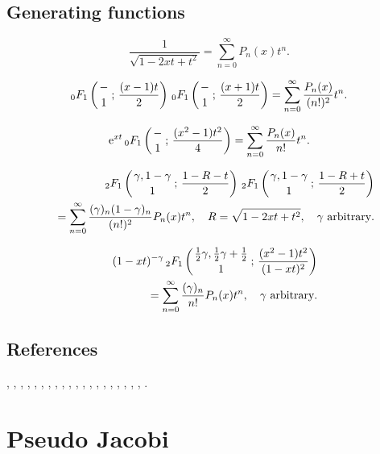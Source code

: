 \documentclass[envcountchap,graybox]{svmono}
\newcommand{\hyp}[5]{\mbox{}_{#1}{F}_{#2}
\left(\genfrac{}{}{0pt}{}{#3}{#4}\,;\,#5\right)}
\newcommand{\e}{\textrm{e}}
\begin{document}
\subsection*{Generating functions}
\begin{equation}
\label{GenLegendre1}
\frac{1}{\sqrt{1-2xt+t^2}}=\sum_{n=0}^{\infty}P_n(x)t^n.
\end{equation}

\begin{equation}
\label{GenLegendre2}
\hyp{0}{1}{-}{1}{\frac{(x-1)t}{2}}\,\hyp{0}{1}{-}{1}{\frac{(x+1)t}{2}}=
\sum_{n=0}^{\infty}\frac{P_n(x)}{(n!)^2}t^n.
\end{equation}

\begin{equation}
\label{GenLegendre3}
\e^{xt}\,\hyp{0}{1}{-}{1}{\frac{(x^2-1)t^2}{4}}=
\sum_{n=0}^{\infty}\frac{P_n(x)}{n!}t^n.
\end{equation}

\begin{eqnarray}
\label{GenLegendre4}
& &\hyp{2}{1}{\gamma,1-\gamma}{1}{\frac{1-R-t}{2}}\,
\hyp{2}{1}{\gamma,1-\gamma}{1}{\frac{1-R+t}{2}}\nonumber\\
& &{}=\sum_{n=0}^{\infty}\frac{(\gamma)_n(1-\gamma)_n}{(n!)^2}P_n(x)t^n,
\quad R=\sqrt{1-2xt+t^2},\quad\textrm{$\gamma$ arbitrary}.
\end{eqnarray}

\begin{eqnarray}
\label{GenLegendre5}
& &(1-xt)^{-\gamma}\,\hyp{2}{1}{\frac{1}{2}\gamma,\frac{1}{2}\gamma+\frac{1}{2}}{1}
{\frac{(x^2-1)t^2}{(1-xt)^2}}\nonumber\\
& &{}=\sum_{n=0}^{\infty}\frac{(\gamma)_n}{n!}P_n(x)t^n,\quad\textrm{$\gamma$ arbitrary}.
\end{eqnarray}

\subsection*{References}
\cite{Abram}, \cite{Alladi}, \cite{AlSalam90}, \cite{Bhonsle}, \cite{Brafman51},
\cite{Carlitz57II}, \cite{Chihara78}, \cite{Danese}, \cite{Dattoli2001},
\cite{DilcherStolarsky}, \cite{ElbertLaforgia94}, \cite{Erdelyi+}, \cite{Grad},
\cite{Mathai}, \cite{Nikiforov+}, \cite{NikiforovUvarov}, \cite{Olver}, \cite{Rainville},
\cite{Szego75}, \cite{Temme}, \cite{Zayed}.

\newpage

\section{Pseudo Jacobi}
\end{document}
